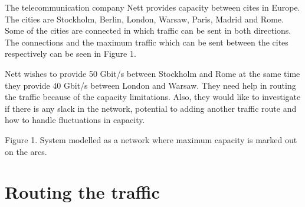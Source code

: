 The telecommunication company Nett provides capacity between cites in Europe. The cities are Stockholm, Berlin, London, Warsaw, Paris, Madrid and Rome. Some of the cities are connected in which traffic can be sent in both directions. The connections and the maximum traffic which can be sent between the cites respectively can be seen in Figure 1.

Nett wishes to provide 50 Gbit/s between Stockholm and Rome at the same time they provide 40 Gbit/s between London and Warsaw. They need help in routing the traffic because of the capacity limitations. Also, they would like to investigate if there is any slack in the network, potential to adding another traffic route and how to handle fluctuations in capacity.

\begin{center}
\end{center}
Figure 1. System modelled as a network where maximum capacity is marked out on the arcs.

\newpage

\section*{Routing the traffic}

